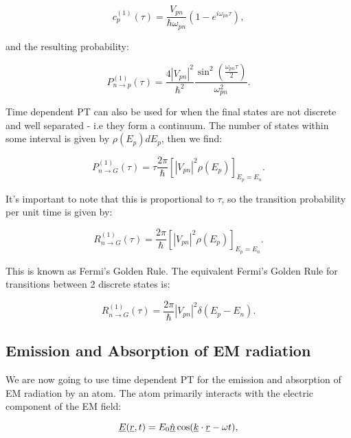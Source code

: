 \begin{equation}
    c^{(1)}_p(\tau) = \frac{V_{pn}}{\hbar \omega_{pn}} (1 - e^{i \omega_{pn} \tau}),
\end{equation}

\noindent and the resulting probability:

\begin{equation}
    P^{(1)}_{n \rightarrow p}(\tau) = \frac{4 |V_{pn}|^2}{\hbar^2} \frac{\sin^2(\frac{\omega_{pn} \tau}{2})}{\omega_{pn}^2}.
\end{equation}

\noindent Time dependent PT can also be used for when the final states are not discrete and well separated - i.e they form a continuum. The number of states within some interval is given by $\rho(E_p) dE_p$, then we find:

\begin{equation}
    P^{(1)}_{n \rightarrow G}(\tau) = \tau \frac{2\pi}{\hbar}[|V_{pn}|^2 \rho(E_p)]_{E_p = E_n}.
\end{equation}

\noindent It's important to note that this is proportional to $\tau$, so the transition probability per unit time is given by:

\begin{equation}
    \boxed{R^{(1)}_{n \rightarrow G}(\tau) = \frac{2\pi}{\hbar}[|V_{pn}|^2 \rho(E_p)]_{E_p = E_n}}.
    \label{FermiGoldenRuleContinuum}
\end{equation}

\noindent This is known as Fermi's Golden Rule. The equivalent Fermi's Golden Rule for transitions between 2 discrete states is:

\begin{equation}
    \boxed{R^{(1)}_{n \rightarrow G}(\tau) = \frac{2\pi}{\hbar}|V_{pn}|^2 \delta(E_p - E_n)}.
\end{equation}

\subsection{Emission and Absorption of EM radiation}

We are now going to use time dependent PT for the emission and absorption of EM radiation by an atom. The atom primarily interacts with the electric component of the EM field:

\begin{equation}
    \underline{E}(\underline{r}, t) = E_0 \underline{\Hat{n}}\cos(\underline{k} \cdot \underline{r} - \omega t),
\end{equation}


